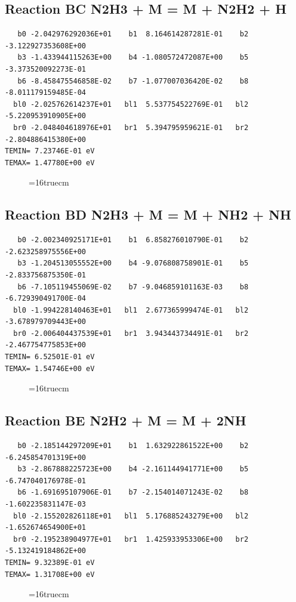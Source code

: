 \documentclass[12pt,dvipdfm]{article}
\begin{document}
\subsection{
Reaction BC N2H3 + M = M + N2H2 + H }
\begin{small}\begin{verbatim}
   b0 -2.042976292036E+01    b1  8.164614287281E-01    b2 -3.122927353608E+00
   b3 -1.433944115263E+00    b4 -1.080572472087E+00    b5 -3.373520092273E-01
   b6 -8.458475546858E-02    b7 -1.077007036420E-02    b8 -8.011179159485E-04
  bl0 -2.025762614237E+01   bl1  5.537754522769E-01   bl2 -5.220953910905E+00
  br0 -2.048404618976E+01   br1  5.394795959621E-01   br2 -2.804886415380E+00
TEMIN= 7.23746E-01 eV
TEMAX= 1.47780E+00 eV
   \end{verbatim}\end{small}
\begin{figure}[h!]
\label{n2rates}
\epsfxsize=16truecm
\end{figure}
\newpage

\subsection{
Reaction BD N2H3 + M = M + NH2 + NH  }
\begin{small}\begin{verbatim}
   b0 -2.002340925171E+01    b1  6.858276010790E-01    b2 -2.623258975556E+00
   b3 -1.204513055552E+00    b4 -9.076808758901E-01    b5 -2.833756875350E-01
   b6 -7.105119455069E-02    b7 -9.046859101163E-03    b8 -6.729390491700E-04
  bl0 -1.994228140463E+01   bl1  2.677365999474E-01   bl2 -3.678979709443E+00
  br0 -2.006404437539E+01   br1  3.943443734491E-01   br2 -2.467754775853E+00
TEMIN= 6.52501E-01 eV
TEMAX= 1.54746E+00 eV
   \end{verbatim}\end{small}
\begin{figure}[h!]
\label{n2rates}
\epsfxsize=16truecm
\end{figure}
\newpage

\subsection{
Reaction BE N2H2 + M = M + 2NH }
\begin{small}\begin{verbatim}
   b0 -2.185144297209E+01    b1  1.632922861522E+00    b2 -6.245854701319E+00
   b3 -2.867888225723E+00    b4 -2.161144941771E+00    b5 -6.747040176978E-01
   b6 -1.691695107906E-01    b7 -2.154014071243E-02    b8 -1.602235831147E-03
  bl0 -2.155202826118E+01   bl1  5.176885243279E+00   bl2 -1.652674654900E+01
  br0 -2.195238904977E+01   br1  1.425933953306E+00   br2 -5.132419184862E+00
TEMIN= 9.32389E-01 eV
TEMAX= 1.31708E+00 eV
   \end{verbatim}\end{small}
\begin{figure}[h!]
\label{n2rates}
\epsfxsize=16truecm
\end{figure}
\newpage
\end{document}
